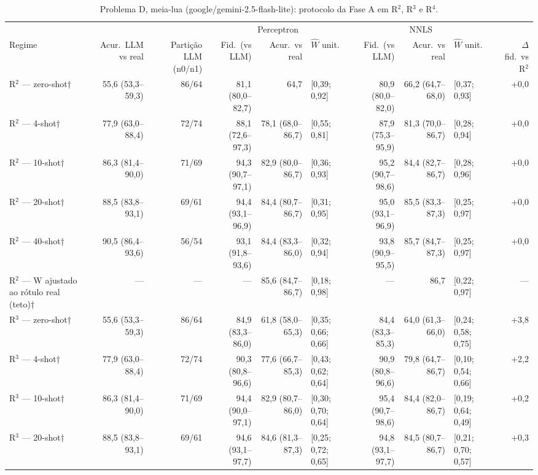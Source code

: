 \begin{table}[htbp]
\centering
\footnotesize
\caption{Problema D, meia-lua (google/gemini-2.5-flash-lite): protocolo da Fase A em R$^2$, R$^3$ e R$^4$.}
\label{tab:T3_D_flashlite}
\begin{tabular}{lrrrrlrrlr}
\toprule
 &  &  & \multicolumn{3}{c}{Perceptron} & \multicolumn{3}{c}{NNLS} &  \\ \cmidrule(lr){4-6} \cmidrule(lr){7-9}
Regime & Acur.\ LLM vs real & Partição LLM (n0/n1) & Fid.\ (vs LLM) & Acur.\ vs real & $\hat{W}$ unit. & Fid.\ (vs LLM) & Acur.\ vs real & $\hat{W}$ unit. & $\Delta$ fid.\ vs R$^2$ \\
\midrule
R$^2$ — zero-shot† & 55,6 (53,3–59,3) & 86/64 & 81,1 (80,0–82,7) & 64,7 & [0,39; 0,92] & 80,9 (80,0–82,0) & 66,2 (64,7–68,0) & [0,37; 0,93] & +0,0 \\
R$^2$ — 4-shot† & 77,9 (63,0–88,4) & 72/74 & 88,1 (72,6–97,3) & 78,1 (68,0–86,7) & [0,55; 0,81] & 87,9 (75,3–95,9) & 81,3 (70,0–86,7) & [0,28; 0,94] & +0,0 \\
R$^2$ — 10-shot† & 86,3 (81,4–90,0) & 71/69 & 94,3 (90,7–97,1) & 82,9 (80,0–86,7) & [0,36; 0,93] & 95,2 (90,7–98,6) & 84,4 (82,7–86,7) & [0,28; 0,96] & +0,0 \\
R$^2$ — 20-shot† & 88,5 (83,8–93,1) & 69/61 & 94,4 (93,1–96,9) & 84,4 (80,7–86,7) & [0,31; 0,95] & 95,0 (93,1–96,9) & 85,5 (83,3–87,3) & [0,25; 0,97] & +0,0 \\
R$^2$ — 40-shot† & 90,5 (86,4–93,6) & 56/54 & 93,1 (91,8–93,6) & 84,4 (83,3–86,0) & [0,32; 0,94] & 93,8 (90,9–95,5) & 85,7 (84,7–87,3) & [0,25; 0,97] & +0,0 \\
R$^2$ — W ajustado ao rótulo real (teto)† & — & — & — & 85,6 (84,7–86,7) & [0,18; 0,98] & — & 86,7 & [0,22; 0,97] & — \\
\midrule
R$^3$ — zero-shot† & 55,6 (53,3–59,3) & 86/64 & 84,9 (83,3–86,0) & 61,8 (58,0–65,3) & [0,35; 0,66; 0,66] & 84,4 (83,3–85,3) & 64,0 (61,3–66,0) & [0,24; 0,58; 0,75] & +3,8 \\
R$^3$ — 4-shot† & 77,9 (63,0–88,4) & 72/74 & 90,3 (80,8–96,6) & 77,6 (66,7–85,3) & [0,43; 0,62; 0,64] & 90,9 (80,8–96,6) & 79,8 (64,7–86,7) & [0,10; 0,54; 0,66] & +2,2 \\
R$^3$ — 10-shot† & 86,3 (81,4–90,0) & 71/69 & 94,4 (90,0–97,1) & 82,9 (80,7–86,0) & [0,30; 0,70; 0,64] & 95,4 (90,7–98,6) & 84,4 (82,0–86,7) & [0,19; 0,64; 0,49] & +0,2 \\
R$^3$ — 20-shot† & 88,5 (83,8–93,1) & 69/61 & 94,6 (93,1–97,7) & 84,6 (81,3–87,3) & [0,25; 0,72; 0,65] & 94,8 (93,1–97,7) & 84,5 (80,7–86,7) & [0,21; 0,70; 0,57] & +0,3 \\

\end{tabular}
\end{table}
